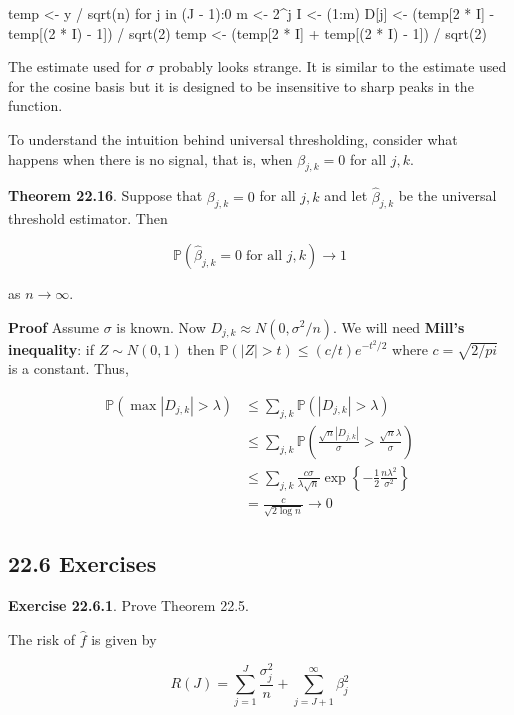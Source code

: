 \begin{console}
temp <- y / sqrt(n)
for j in (J - 1):0 {
  m <- 2^{j}
  I <- (1:m)
  D[j] <- (temp[2 * I] - temp[(2 * I) - 1]) / sqrt(2)
  temp <- (temp[2 * I] + temp[(2 * I) - 1]) / sqrt(2)
}
\end{console}

The estimate used for \(\sigma\) probably looks strange. It is similar
to the estimate used for the cosine basis but it is designed to be
insensitive to sharp peaks in the function.

To understand the intuition behind universal thresholding, consider what
happens when there is no signal, that is, when \(\beta_{j, k} = 0\) for
all \(j, k\).

\textbf{Theorem 22.16}. Suppose that \(\beta_{j, k} = 0\) for all
\(j, k\) and let \(\hat{\beta}_{j, k}\) be the universal threshold
estimator. Then

\[ \mathbb{P}\left(\hat{\beta}_{j, k} = 0 \; \text{for all } j, k \right) \rightarrow 1 \]

as \(n \rightarrow \infty\).

\textbf{Proof} Assume \(\sigma\) is known. Now
\(D_{j, k} \approx N(0, \sigma^{2} / n)\). We will need \textbf{Mill's
inequality}: if \(Z \sim N(0, 1)\) then
\(\mathbb{P}(|Z| > t) \leq (c / t) e^{-t^{2} / 2}\) where
\(c = \sqrt{2 / pi}\) is a constant. Thus,

\begin{align*}
\mathbb{P}(\max |D_{j, k}| > \lambda) &\leq \sum_{j, k} \mathbb{P}(|D_{j, k}| > \lambda) \\
& \leq \sum_{j, k} \mathbb{P} \left( \frac{\sqrt{n} |D_{j, k}|}{\sigma} > \frac{\sqrt{n} \lambda}{\sigma} \right) \\
& \leq \sum_{j, k} \frac{c \sigma}{\lambda \sqrt{n}} \exp \left\{ - \frac{1}{2} \frac{n \lambda^{2}}{\sigma^{2}} \right\} \\
& = \frac{c}{\sqrt{2 \log n}} \rightarrow 0
\end{align*}

\subsection*{22.6 Exercises}

\textbf{Exercise 22.6.1}. Prove Theorem 22.5.

The risk of \(\hat{f}\) is given by

\[ R(J) = \sum_{j=1}^J \frac{\sigma_{j}^{2}}{n} + \sum_{j=J+1}^{\infty} \beta_{j}^{2} \]

